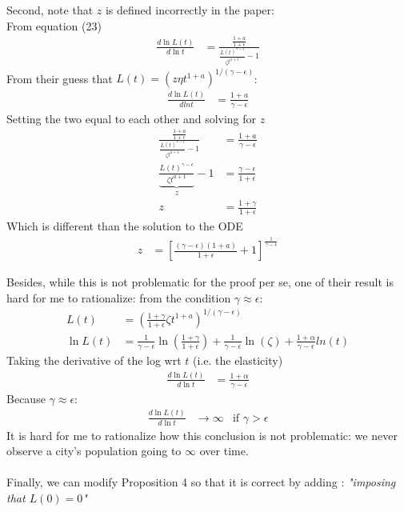 \documentclass[10pt, final]{article}
\begin{document}
Second, note that $z$ is defined incorrectly in the paper:\\
From equation (23)
\begin{align*}
    \frac{d \ln L(t)}{d \ln t} &= \frac{\frac{1 + a}{1+\epsilon}}{\frac{L(t)^{\gamma-\epsilon}}{\zeta t ^{a+1}} -1 }
\end{align*}
From their guess that $L(t) = (z \eta t^{1+a})^{1/(\gamma-\epsilon)}$:
\begin{align*}
    \frac{d \ln L(t)}{d ln t} &= \frac{1+a}{\gamma-\epsilon}
\end{align*}
Setting the two equal to each other and solving for $z$
\begin{align*}
    \frac{\frac{1 + a}{1+\epsilon}}{\frac{L(t)^{\gamma-\epsilon}}{\zeta t ^{a+1}} -1 } &= \frac{1+a}{\gamma-\epsilon} \\
    \underbrace{\frac{L(t)^{\gamma-\epsilon}}{\zeta t ^{a+1}}}_{z} -1 &= \frac{\gamma-\epsilon}{1+\epsilon} \\
    z &= \frac{1 + \gamma}{1 + \epsilon}
\end{align*}
Which is different than the solution to the ODE
\begin{align*}
    z &= [\frac{(\gamma - \epsilon)(1+a)}{1+\epsilon} + 1]^{\frac{1}{\gamma-\epsilon}}
\end{align*}



Besides, while this is not problematic for the proof per se, one of their result is hard for me to rationalize: from the condition $\gamma \approx \epsilon$: 
\begin{align*}
    L(t) &= (\frac{1 + \gamma}{1 + \epsilon} \zeta t^{1+a})^{1/(\gamma - \epsilon)} \\
    \ln L(t) &= \frac{1}{\gamma - \epsilon} \ln(\frac{1+\gamma}{1+\epsilon}) + \frac{1}{\gamma - \epsilon} \ln(\zeta) + \frac{1+\alpha}{\gamma - \epsilon} ln(t)
\end{align*}
Taking the derivative of the log wrt $t$ (i.e. the elasticity)
\begin{align*}
    \frac{d \ln L(t)}{d \ln t} &= \frac{1+\alpha}{\gamma - \epsilon}
\end{align*}
Because $\gamma \approx \epsilon$:
\begin{align*}
    \frac{d \ln L(t)}{d \ln t} &\to \infty & \text{if } \gamma > \epsilon
\end{align*}
It is hard for me to rationalize how this conclusion is not problematic: we never observe a city's population going to $\infty$ over time.
\\
\\
Finally, we can modify Proposition 4 so that it is correct by adding : \textit{"imposing that $L(0) = 0$"}
\end{document}
